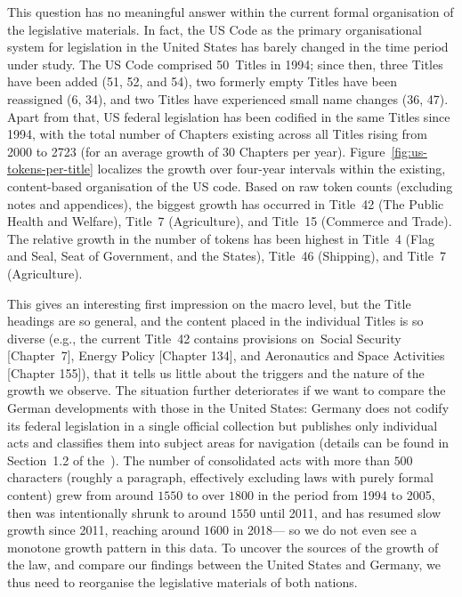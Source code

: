 This question has no meaningful answer within the current formal organisation of the legislative materials. 
In fact, the US Code as the primary organisational system for legislation in the United States has barely changed in the time period under study. 
The US Code comprised 50~Titles in 1994;
since then, three Titles have been added (51, 52, and 54), 
two formerly empty Titles have been reassigned (6, 34), 
and two Titles have experienced small name changes (36, 47). 
Apart from that, US federal legislation has been codified in the same Titles since 1994,
with the total number of Chapters existing across all Titles rising from 2000 to 2723 (for an average growth of 30 Chapters per year). 
Figure~\ref{fig:us-tokens-per-title} localizes the growth over four-year intervals within the existing, 
content-based organisation of the US code. 
Based on raw token counts (excluding notes and appendices), 
the biggest growth has occurred in Title~42 (The Public Health and Welfare), 
Title~7 (Agriculture), 
and Title~15 (Commerce and Trade). 
The relative growth in the number of tokens has been highest in 
Title~4 (Flag and Seal, Seat of Government, and the States), 
Title~46 (Shipping), 
and Title~7 (Agriculture).

This gives an interesting first impression on the macro level,
but the Title headings are so general, 
and the content placed in the individual Titles is so diverse (e.g., the current Title~42 contains provisions on~Social Security [Chapter~7], Energy Policy [Chapter 134], and Aeronautics and Space Activities [Chapter 155]), 
that it tells us little about the triggers and the nature of the growth we observe. 
The situation further deteriorates if we want to compare the German developments with those in the United States: 
Germany does not codify its federal legislation in a single official collection but publishes only individual acts and classifies them into subject areas for navigation
(details can be found in Section~1.2 of the~\suppi). 
The number of consolidated acts with more than $500$ characters (roughly a paragraph, effectively excluding laws with purely formal content) grew from around $1550$ to over $1800$ in the period from 1994 to 2005, 
then was intentionally shrunk to around $1550$ until 2011,
and has resumed slow growth since 2011, reaching around $1600$ in 2018---%
so we do not even see a monotone growth pattern in this data.
To uncover the sources of the growth of the law, 
and compare our findings between the United States and Germany,
we thus need to reorganise the legislative materials of both nations.

